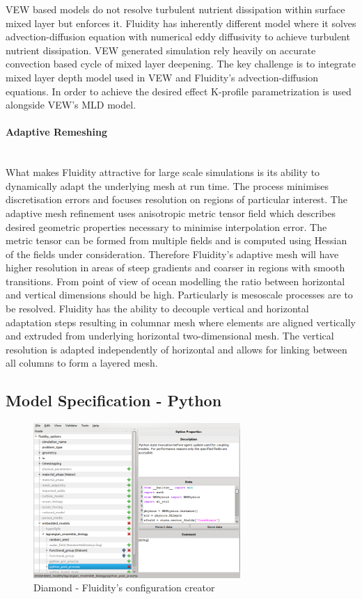 \documentclass[12pt, a4paper]{report}
\newcommand{\myparagraph}[1]{\paragraph{#1}\mbox{}\\}
\begin{document}
VEW based models do not resolve turbulent nutrient dissipation within
surface mixed layer but enforces it. Fluidity has inherently different
model where it solves advection-diffusion equation with numerical eddy
diffusivity to achieve turbulent nutrient dissipation.
VEW generated simulation rely heavily on accurate convection based
cycle of mixed layer deepening. The key challenge is to integrate
mixed layer depth model used in VEW and Fluidity's advection-diffusion
equations. In order to achieve the desired effect K-profile parametrization
is used alongside VEW's MLD model.

\myparagraph{Adaptive Remeshing}\label{para:remesh}
What makes Fluidity attractive for large scale simulations is its ability
to dynamically adapt the underlying mesh at run time. The process minimises
discretisation errors and focuses resolution on regions of particular interest.
The adaptive mesh refinement uses anisotropic metric tensor field which
describes desired geometric properties necessary to minimise interpolation error.
The metric tensor can be formed from multiple fields and is computed using
Hessian of the fields under consideration. Therefore Fluidity's adaptive
mesh will have higher resolution in areas of steep gradients and coarser
in regions with smooth transitions.
From point of view of ocean modelling the ratio between horizontal
and vertical dimensions should be high. Particularly is mesoscale processes
are to be resolved. Fluidity has the ability to decouple vertical
and horizontal adaptation steps resulting in columnar mesh where elements
are aligned vertically and extruded from underlying horizontal two-dimensional mesh.
The vertical resolution is adapted independently of horizontal and allows
for linking between all columns to form a layered mesh.

\subsection{Model Specification - Python}\label{subsec:model-spec-py}

\begin{figure}[H]
  \begin{center}
    \includegraphics[width=0.7\textwidth,natwidth=800,natheight=600]{images/diamond.png}
    \caption{Diamond - Fluidity's configuration creator}
    \label{fig:diamond}
  \end{center}
\end{figure}
\end{document}
